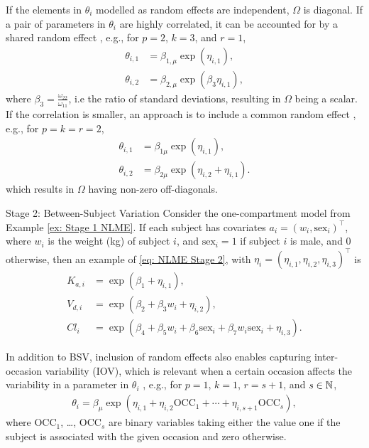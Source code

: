 If the elements in $\theta_i$ modelled as random effects are independent, $\Omega$ is diagonal. 
If a pair of parameters in $\theta_i$ are highly correlated, it can be accounted for by a shared random effect \citep[p. 239]{bonate}, e.g., for $p = 2$, $k = 3$, and $r = 1$,
\begin{align*}
    \theta_{i,1} &= \beta_{1, \mu} \exp(\eta_{i,1}), \\
     \theta_{i,2} &= \beta_{2, \mu} \exp(\beta_3 \eta_{i,1}),
\end{align*}
where $\beta_3 = \frac{\omega_{22}}{\omega_{11}}$, i.e the ratio of standard deviations, resulting in $\Omega$ being a scalar. If the correlation is smaller, an approach is to include a common random effect \citep[p. 240]{bonate}, e.g., for $ p = k = r = 2$,
\begin{align*}
    \theta_{i,1}  & = \beta_{1\mu} \exp(\eta_{i,1}), \\
     \theta_{i,2} & = \beta_{2\mu} \exp(\eta_{i,2} + \eta_{i,1}).
\end{align*}
which results in $\Omega$ having non-zero off-diagonals.

\begin{exmp}{Stage 2: Between-Subject Variation}
Consider the one-compartment model from Example \ref{ex: Stage 1 NLME}. If each subject has covariates $a_i=(w_i,\text{sex}_i)^\top$, where $w_i$ is the weight (kg) of subject $i$, and $\text{sex}_i=1$ if subject $i$ is male, and  $0$ otherwise, then an example of \eqref{eq: NLME Stage 2}, with $\eta_i=(\eta_{i,1},\eta_{i,2},\eta_{i,3})^\top$ is \label{ex: Stage 2 NLME}
\begin{align*}
    K_{a,i}&=\exp(\beta_1+\eta_{i,1}),\\
    V_{d,i}&=\exp(\beta_2+\beta_3w_i+\eta_{i,2}),\\
    Cl_i &= \exp(\beta_4+\beta_5w_i+\beta_6\text{sex}_i+\beta_7w_i\text{sex}_i+\eta_{i,3}).
\end{align*}
\end{exmp}
In addition to BSV, inclusion of random effects also enables capturing inter-occasion variability (IOV), which is relevant when a certain occasion affects the variability in a parameter in $\theta_i$ \citep[pp. 241-243]{bonate}, e.g., for $p = 1$, $k = 1$, $r = s + 1$, and $s \in \mathbb{N}$,
\begin{align} \label{eq: IOV with studies}
    \theta_{i} = \beta_\mu \exp(\eta_{i,1} + \eta_{i,2} \text{OCC}_1 + \cdots + \eta_{i,s+1} \text{OCC}_s),
\end{align}
where OCC$_1$, \dots , OCC$_s$ are binary variables taking either the value one if the subject is associated with the given occasion and zero otherwise.

